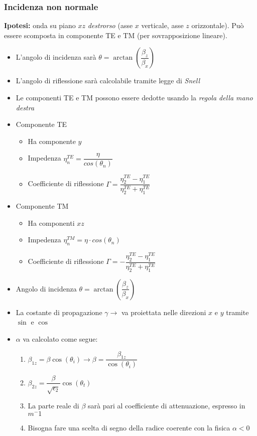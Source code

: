 \documentclass{article}
\begin{document}
\subsubsection{Incidenza non normale}
\textbf{Ipotesi:} onda su piano \(xz\) \textit{destrorso} (asse \(x\) verticale, asse \(z\) orizzontale). Può essere scomposta in componente TE e TM (per sovrapposizione lineare).
\begin{itemize}
	\item L'angolo di incidenza sarà \(\theta = \arctan\left(\dfrac{\beta_z}{\beta_x}\right)\)
	\item L'angolo di riflessione sarà calcolabile tramite legge di \textit{Snell}
	\item Le componenti TE e TM possono essere dedotte usando la \textit{regola della mano destra}
\end{itemize}
\begin{itemize}
	\item Componente TE
	\begin{itemize}
		\item Ha componente \(y\)
		\item Impedenza \( \displaystyle \eta^{TE}_n = \dfrac{\eta}{cos(\theta_n)} \)
		\item Coefficiente di riflessione \(\displaystyle \Gamma = \dfrac{\eta_{2}^{TE} - \eta_{1}^{TE}}{\eta_{2}^{TE} + \eta_{1}^{TE}} \)
	\end{itemize}
	\item Componente TM
	\begin{itemize}
		\item Ha componenti \(xz\)
		\item Impedenza \(\displaystyle \eta^{TM}_n = \eta \cdot cos(\theta_n) \)
		\item Coefficiente di riflessione \(\displaystyle \Gamma = - \dfrac{\eta_{2}^{TE} - \eta_{1}^{TE}}{\eta_{2}^{TE} + \eta_{1}^{TE}} \)
	\end{itemize}
\end{itemize}
\begin{itemize}
	\item Angolo di incidenza \( \theta = \arctan\left( \dfrac{\beta_z}{\beta_x} \right) \)
	\item La costante di propagazione \(\gamma \rightarrow\) va proiettata nelle direzioni \(x\) e \(y\) tramite \(\sin\) e \(\cos\)
	\item \(\alpha\) va calcolato come segue:
	\begin{enumerate}
		\item \(\beta_{1z} = \beta \cos(\theta_i) \rightarrow \beta = \dfrac{\beta_{1z}}{\cos(\theta_i)} \)
		\item \( \beta_{2z} = \dfrac{\beta}{\sqrt{\epsilon_2}} \cos(\theta_t) \)
		\item La parte reale di \(\beta\) sarà pari al coefficiente di attenuazione, espresso in \(m^-1\)
		\item Bisogna fare una scelta di segno della radice coerente con la fisica \( \alpha < 0 \)
	\end{enumerate}
\end{itemize}
\end{document}
